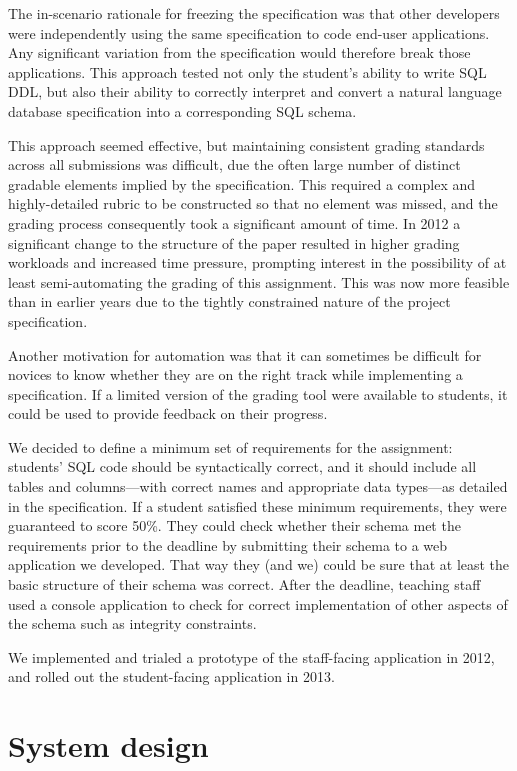 \documentclass[sigconf, authordraft, capitalise]{acmart}
\begin{document}
The in-scenario rationale for freezing the specification was that other developers were independently using the same specification to code end-user applications. Any significant variation from the specification would therefore break those applications. This approach tested not only the student's ability to write SQL DDL, but also their ability to correctly interpret and convert a natural language database specification into a corresponding SQL schema.

This approach seemed effective, but maintaining consistent grading standards across all submissions was difficult, due the often large number of distinct gradable elements implied by the specification. This required a complex and highly-detailed rubric to be constructed so that no element was missed, and the grading process consequently took a significant amount of time. In 2012 a significant change to the structure of the paper resulted in higher grading workloads and increased time pressure, prompting interest in the possibility of at least semi-automating the grading of this assignment. This was now more feasible than in earlier years due to the tightly constrained nature of the project specification.

Another motivation for automation was that it can sometimes be difficult for novices to know whether they are on the right track while implementing a specification. If a limited version of the grading tool were available to students, it could be used to provide feedback on their progress.

We decided to define a minimum set of requirements for the assignment: students' SQL code should be syntactically correct, and it should include all tables and columns---with correct names and appropriate data types---as detailed in the specification. If a student satisfied these minimum requirements, they were guaranteed to score 50\%. They could check whether their schema met the requirements prior to the deadline by submitting their schema to a web application we developed. That way they (and we) could be sure that at least the basic structure of their schema was correct. After the deadline, teaching staff used a console application to check for correct implementation of other aspects of the schema such as integrity constraints.

We implemented and trialed a prototype of the staff-facing application in 2012, and rolled out the student-facing application in 2013.


\section{System design}
\label{sec-design}
\end{document}
